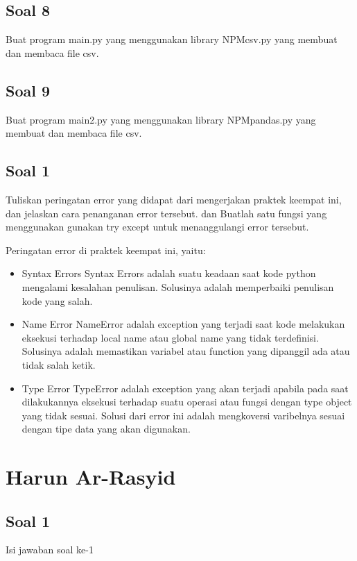 \subsection{Soal 8}
Buat program main.py yang menggunakan library NPMcsv.py yang membuat dan membaca file csv.


\subsection{Soal 9}
Buat program main2.py yang menggunakan library NPMpandas.py yang membuat dan membaca file csv.


\subsection{Soal 1}
Tuliskan  peringatan  error  yang  didapat  dari  mengerjakan  praktek  keempat  ini, dan  jelaskan  cara  penanganan  error  tersebut.   dan  Buatlah  satu  fungsi  yang menggunakan gunakan try except untuk menanggulangi error tersebut.

Peringatan error di praktek keempat ini, yaitu:
\begin{itemize}
	\item Syntax Errors
	Syntax Errors adalah suatu keadaan saat kode python mengalami kesalahan penulisan. Solusinya adalah memperbaiki penulisan kode yang salah.
	
	\item Name Error
	NameError adalah exception yang terjadi saat kode melakukan eksekusi terhadap local name atau global name yang tidak terdefinisi. Solusinya adalah memastikan variabel atau function yang dipanggil ada atau tidak salah ketik.
	
	\item Type Error
	TypeError adalah exception yang akan terjadi apabila pada saat dilakukannya eksekusi terhadap suatu operasi atau fungsi dengan type object yang tidak sesuai. Solusi dari error ini adalah mengkoversi varibelnya sesuai dengan tipe data yang akan digunakan.
\end{itemize}

\section{Harun Ar-Rasyid}
\subsection{Soal 1}
Isi jawaban soal ke-1

